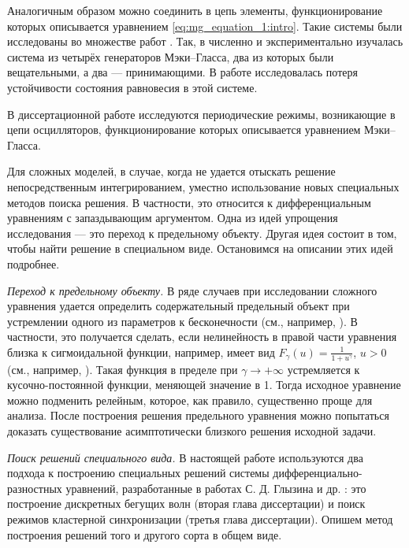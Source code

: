 Аналогичным образом можно соединить в цепь элементы, функционирование которых описывается уравнением \eqref{eq:mg_equation_1:intro}. Такие системы были исследованы во множестве работ \cite{Preobrazhenskaia2021, Tateno2012, Sano2007, Wan2009}. Так, в \cite{Sano2007} численно и экспериментально изучалась система из четырёх генераторов Мэки--Гласса, два из которых были вещательными, а два --- принимающими. В работе \cite{Wan2009} исследовалась потеря устойчивости состояния равновесия в этой системе.

В диссертационной работе исследуются периодические режимы, возникающие в цепи осцилляторов, функционирование которых описывается уравнением Мэки--Гласса. 


{\methods} Для сложных моделей, в случае, когда не удается отыскать решение непосредственным интегрированием, уместно использование новых специальных методов поиска решения. В частности, это относится к дифференциальным уравнениям с запаздывающим аргументом. Одна из идей упрощения исследования --- это переход к предельному объекту. Другая идея состоит в том, чтобы найти решение в специальном виде. Остановимся на описании этих идей подробнее.

\textit{Переход к предельному объекту.} В ряде случаев при исследовании сложного уравнения удается определить содержательный предельный объект при устремлении одного из параметров к бесконечности (см., например, \cite{Kolesov1997}). В частности, это получается сделать, если нелинейность в правой части уравнения близка к сигмоидальной функции, например, имеет вид $F_\gamma(u)=\frac{1}{1 + u^\gamma}$, $u > 0$ (см., например, \cite{Preobrazhenskaya2020, Glyzin2017, Krisztin2020, Bartha2021}). Такая функция в пределе при $\gamma\to+\infty$ устремляется к кусочно-постоянной функции, меняющей значение в 1. Тогда исходное уравнение можно подменить релейным, которое, как правило, существенно проще для анализа. После построения решения предельного уравнения можно попытаться доказать существование асимптотически близкого решения исходной задачи.

\textit{Поиск решений специального вида.} В настоящей работе используются два подхода к построению специальных решений системы дифференциально-разностных уравнений, разработанные в работах С. Д. Глызина и др. \cite{GlyKol2013, GlyKol2013a, Glyzin2014}: это построение дискретных бегущих волн (вторая глава диссертации) и поиск режимов кластерной синхронизации (третья глава диссертации). Опишем метод построения решений того и другого сорта в общем виде.

